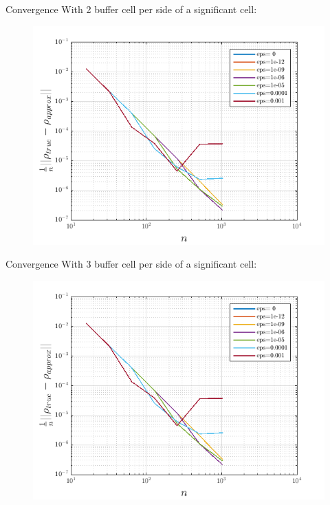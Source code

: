 \documentclass{beamer}
\begin{document}
\begin{frame}{Convergence}
  With 2 buffer cell per side of a significant cell:
  \begin{figure}
    \center
    \includegraphics[scale=0.5]{buffer2.png}
  \end{figure}
\end{frame}

\begin{frame}{Convergence}
  With 3 buffer cell per side of a significant cell:
  \begin{figure}
    \center
    \includegraphics[scale=0.5]{buffer3.png}
  \end{figure}
\end{frame}
\end{document}
